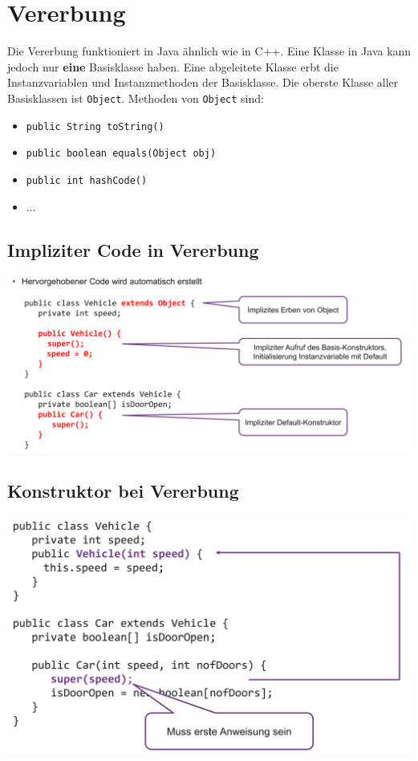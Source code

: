 \section{Vererbung}
Die Vererbung funktioniert in Java ähnlich wie in C++. Eine Klasse in Java kann jedoch nur \textbf{eine} Basisklasse haben.
Eine abgeleitete Klasse erbt die Instanzvariablen und Instanzmethoden der Basisklasse.
Die oberste Klasse aller Basisklassen ist \verb|Object|. Methoden von \verb|Object| sind:
\begin{itemize}
    \itemsep0em
    \item \verb|public String toString()|
    \item \verb|public boolean equals(Object obj)|
    \item \verb|public int hashCode()|
    \item ...
\end{itemize}

\subsection{Impliziter Code in Vererbung}
\begin{center}
    \includegraphics[width=0.9\columnwidth]{pictures/vererbung-implizit.png}
\end{center}

\subsection{Konstruktor bei Vererbung}
\begin{center}
    \includegraphics[width=0.9\columnwidth]{pictures/vererbung-konstr.png}
\end{center}

